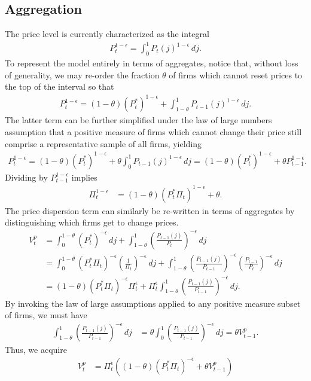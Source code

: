 \documentclass[12 pt, oneside]{article}
\theoremstyle{definition}
\theoremstyle{definition}
\theoremstyle{definition}
\begin{document}
\subsection{Aggregation}
The price level is currently characterized as the integral
\begin{align*}
  P_t^{1 - \epsilon} = \int_0^1 P_t(j)^{1 - \epsilon}\, dj.
\end{align*}
To represent the model entirely in terms of aggregates, notice that, without loss of generality, we may re-order the fraction $\theta$ of firms which cannot reset prices to the top of the interval so that
\begin{align*}
  P_t^{1 - \epsilon} = (1 - \theta)(P_t^*)^{1 - \epsilon} +  \int_{1 - \theta}^1 P_{t - 1}(j)^{1 - \epsilon}\, dj.
\end{align*}
The latter term can be further simplified under the law of large numbers assumption that a positive measure of firms which cannot change their price
still comprise a representative sample of all firms, yielding
\begin{align*}
  P_t^{1 - \epsilon} = (1 - \theta)(P_t^*)^{1 - \epsilon} +  \theta\int_0^1 P_{t - 1}(j)^{1 - \epsilon}\, dj = (1 - \theta)(P_t^*)^{1 - \epsilon} +  \theta P_{t - 1}^{1 - \epsilon}.
\end{align*}
Dividing by $P_{t - 1}^{1 - \epsilon}$ implies
\begin{align}\label{eq:inflation from optimal reset price}
  \Pi_t^{ 1 - \epsilon} & = (1 - \theta) (P_t^*\Pi_t)^{1 - \epsilon} + \theta.
\end{align}
The price dispersion term can similarly be re-written in terms of aggregates by distinguishing which firms get to change prices.
\begin{align*}
  V_t^p & = \int_0^{1 - \theta}\left(P_t^*\right)^{ - \epsilon}\, dj + \int_{1 - \theta}^1 \left(\frac{P_{t - 1}(j)}{P_t}\right)^{ - \epsilon}\, dj\\
      & = \int_0^{1 - \theta}\left(P_t^*\Pi_t\right)^{ - \epsilon}\left(\frac{1}{\Pi_t}\right)^{ - \epsilon}\, dj + \int_{1 - \theta}^1 \left(\frac{P_{t - 1}(j)}{P_{t - 1}}\right)^{ - \epsilon}\left(\frac{P_{t - 1}}{P_t}\right)^{ - \epsilon}\, dj\\
      & = (1 - \theta) (P_t^*\Pi_t)^{-\epsilon} \Pi_t^{\epsilon}  + \Pi_t^{\epsilon} \int_{1 - \theta}^1 \left(\frac{P_{t - 1}(j)}{P_{t - 1}}\right)^{ - \epsilon}\,dj.
\end{align*}
By invoking the law of large assumptions applied to any positive measure subset of firms, we must have
\begin{align*}
  \int_{1 - \theta}^1 \left(\frac{P_{t - 1}(j)}{P_{t - 1}}\right)^{ - \epsilon}\,dj & = \theta\int_0^1 \left(\frac{P_{t - 1}(j)}{P_{t - 1}}\right)^{ - \epsilon}\,dj = \theta V_{t - 1}^p.
\end{align*}
Thus, we acquire
\begin{align}\label{eq:price dispersion evol}
  V_t^p & = \Pi_t^{\epsilon}((1 - \theta) (P_t^* \Pi_t)^{-\epsilon} + \theta V_{t - 1}^p)
\end{align}
\end{document}
